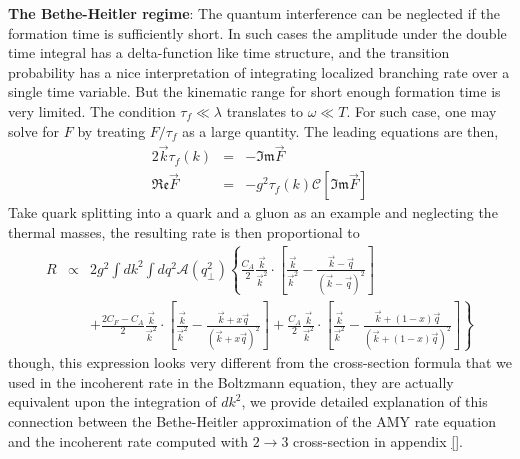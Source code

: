 {\bf The Bethe-Heitler regime}: The quantum interference can be neglected if the formation time is sufficiently short.
In such cases the amplitude under the double time integral has a delta-function like time structure, and the transition probability has a nice interpretation of integrating localized branching rate over a single time variable.
But the kinematic range for short enough formation time is very limited. 
The condition $\tau_f \ll \lambda$ translates to $\omega \ll T$.
For such case, one may solve for $F$ by treating $F/\tau_f$ as a large quantity.
The leading equations are then,
\begin{eqnarray}
2\vec{k}\tau_f(k) &=& - \mathfrak{Im} \vec{F} \\
\mathfrak{Re} \vec{F} &=& -g^2 \tau_f(k)\mathcal{C}[\mathfrak{Im} \vec{F}] 
\end{eqnarray}
Take quark splitting into a quark and a gluon as an example and neglecting the thermal masses, the resulting rate is then proportional to 
\begin{eqnarray}
R &\propto& 2g^2 \int d k^2 \int d q^2 \mathcal{A}(q_\perp^2) \left\{
\frac{C_A}{2} \frac{\vec{k}}{\vec{k}^2}\cdot\left[\frac{\vec{k}}{\vec{k}^2}-\frac{\vec{k}-\vec{q}}{(\vec{k}-\vec{q})^2}\right] \right.\\\nonumber
&&+\left. \frac{2C_F-C_A}{2} \frac{\vec{k}}{\vec{k}^2}\cdot\left[\frac{\vec{k}}{\vec{k}^2}-\frac{\vec{k}+x\vec{q}}{(\vec{k}+x\vec{q})^2}\right]
+\frac{C_A}{2} \frac{\vec{k}}{\vec{k}^2}\cdot\left[\frac{\vec{k}}{\vec{k}^2}-\frac{\vec{k}+(1-x)\vec{q}}{(\vec{k}+(1-x)\vec{q})^2}\right]
\right\}
\end{eqnarray}
though, this expression looks very different from the cross-section formula that we used in the incoherent rate in the Boltzmann equation, they are actually equivalent upon the integration of $dk^2$, we provide detailed explanation of this connection between the Bethe-Heitler approximation of the AMY rate equation and the incoherent rate computed with $2\rightarrow 3$ cross-section in appendix \ref{}.

